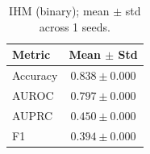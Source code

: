 \begin{table}[h]
\centering
\begin{tabular}{l|c}
\hline
Metric & Mean $\pm$ Std \\
\hline
Accuracy & $0.838 \pm 0.000$ \\
AUROC & $0.797 \pm 0.000$ \\
AUPRC & $0.450 \pm 0.000$ \\
F1 & $0.394 \pm 0.000$ \\
\hline
\end{tabular}
\caption{IHM (binary); mean $\pm$ std across 1 seeds.}
\end{table}
